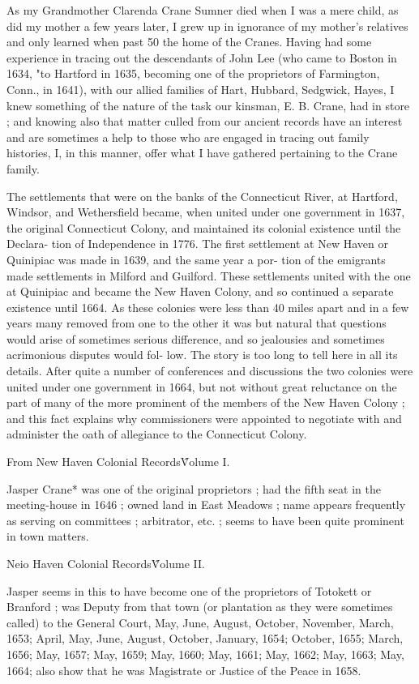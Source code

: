 \documentclass{book}
\begin{document}
As my Grandmother Clarenda Crane Sumner died when I was 
a mere child, as did my mother a few years later, I grew up in 
ignorance of my mother's relatives and only learned when past 
50 the home of the Cranes. Having had some experience in 
tracing out the descendants of John Lee (who came to Boston in 
1634, "to Hartford in 1635, becoming one of the proprietors of 
Farmington, Conn., in 1641), with our allied families of Hart, 
Hubbard, Sedgwick, Hayes, I knew something of the nature of 
the task our kinsman, E. B. Crane, had in store ; and knowing 
also that matter culled from our ancient records have an interest 
and are sometimes a help to those who are engaged in tracing out 
family histories, I, in this manner, offer what I have gathered 
pertaining to the Crane family. 

The settlements that were on the banks of the Connecticut 
River, at Hartford, Windsor, and Wethersfield became, when 
united under one government in 1637, the original Connecticut 
Colony, and maintained its colonial existence until the Declara- 
tion of Independence in 1776. The first settlement at New 
Haven or Quinipiac was made in 1639, and the same year a por- 
tion of the emigrants made settlements in Milford and Guilford. 
These settlements united with the one at Quinipiac and became 
the New Haven Colony, and so continued a separate existence 
until 1664. As these colonies were less than 40 miles apart and 
in a few years many removed from one to the other it was but 
natural that questions would arise of sometimes serious difference, 
and so jealousies and sometimes acrimonious disputes would fol- 
low. The story is too long to tell here in all its details. After 
quite a number of conferences and discussions the two colonies 
were united under one government in 1664, but not without great 
reluctance on the part of many of the more prominent of the 
members of the New Haven Colony ; and this fact explains why 
commissioners were appointed to negotiate with and administer 
the oath of allegiance to the Connecticut Colony. 

From New Haven Colonial Records\^ Volume I. 

Jasper Crane* was one of the original proprietors ; had the 
fifth seat in the meeting-house in 1646 ; owned land in East 
Meadows ; name appears frequently as serving on committees ; 
arbitrator, etc. ; seems to have been quite prominent in town 
matters. 

Neio Haven Colonial Records\^ Volume II. 

Jasper seems in this to have become one of the proprietors of 
Totokett or Branford ; was Deputy from that town (or plantation 
as they were sometimes called) to the General Court, May, June, 
August, October, November, March, 1653; April, May, June, 
August, October, January, 1654; October, 1655; March, 1656; 
May, 1657; May, 1659; May, 1660; May, 1661; May, 1662; 
May, 1663; May, 1664; also show that he was Magistrate or 
Justice of the Peace in 1658. 
\end{document}
